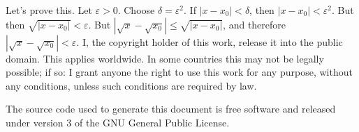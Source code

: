 \documentclass{article}
\theoremstyle{normal}
\theoremstyle{plain}
\begin{document}
    Let's prove this. Let $\varepsilon>0$. Choose $\delta=\varepsilon^{2}$.
    If $|x-x_{0}|<\delta$, then $|x-x_{0}|<\varepsilon^{2}$. But then
    $\sqrt{|x-x_{0}|}<\varepsilon$. But
    $|\sqrt{x}-\sqrt{x_{0}}|\leq\sqrt{|x-x_{0}|}$, and therefore
    $|\sqrt{x}-\sqrt{x_{0}}|<\varepsilon$.
    \newpage
    I, the copyright holder of this work, release it into the public domain.
    This applies worldwide. In some countries this may not be legally possible;
    if so: I grant anyone the right to use this work for any purpose, without
    any conditions, unless such conditions are required by law.
    \par\hfill\par
    The source code used to generate this document is free software and released
    under version 3 of the GNU General Public License.
\end{document}
